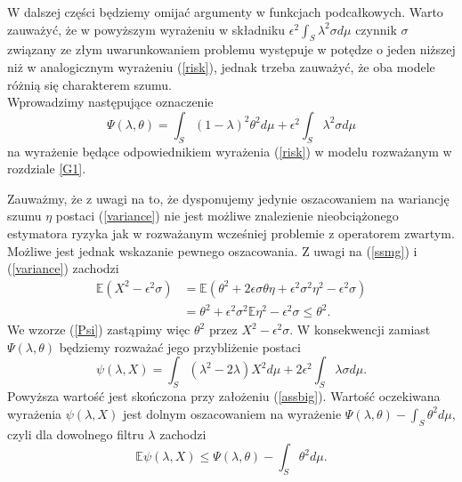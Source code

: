 \documentclass[man,mfiu]{mgrwms}
\begin{document}
W dalszej części będziemy omijać argumenty w funkcjach podcałkowych. Warto zauważyć, że w powyższym wyrażeniu w składniku $\epsilon^2\int_S\lambda^2\sigma d\mu$ czynnik $\sigma$ związany ze złym uwarunkowaniem problemu występuje w potędze o jeden niższej niż w analogicznym wyrażeniu (\ref{risk}), jednak trzeba zauważyć, że oba modele różnią się charakterem szumu.\\
\indent Wprowadzimy następujące oznaczenie 
\begin{equation}\label{Psi}
\Psi(\lambda,\theta)=\int_S(1-\lambda)^2\theta^2d\mu+\epsilon^2\int_S\lambda^2\sigma d\mu
\end{equation}
na wyrażenie będące odpowiednikiem wyrażenia (\ref{risk}) w modelu rozważanym w rozdziale \ref{G1}.

Zauważmy, że z uwagi na to, że dysponujemy jedynie oszacowaniem na wariancję szumu $\eta$ postaci (\ref{variance}) nie jest możliwe znalezienie nieobciążonego estymatora ryzyka jak w rozważanym wcześniej problemie z operatorem zwartym. Możliwe jest jednak wskazanie pewnego oszacowania. Z uwagi na (\ref{ssmg}) i (\ref{variance}) zachodzi
\begin{displaymath}
\begin{split}
\mathbb{E}\left(X^2-\epsilon^2\sigma\right)&=\mathbb{E}\left(\theta^2+2\epsilon\sigma\theta\eta+\epsilon^2\sigma^2\eta^2-\epsilon^2\sigma\right)\\
&=\theta^2+\epsilon^2\sigma^2\mathbb{E}\eta^2-\epsilon^2\sigma\leq \theta^2.
\end{split}
\end{displaymath} 
We wzorze (\ref{Psi}) zastąpimy więc $\theta^2$ przez $X^2 -\epsilon^2 \sigma$. W konsekwencji zamiast $\Psi(\lambda,\theta)$ będziemy rozważać jego przybliżenie postaci 
\begin{equation}\label{ure1}
\psi(\lambda,X)=\int_S(\lambda^2-2\lambda)X^2 d\mu+ 2\epsilon^2\int_S\lambda\sigma d\mu.
\end{equation}
Powyższa wartość jest skończona przy założeniu (\ref{assbig}). Wartość oczekiwana wyrażenia $\psi(\lambda,X)$ jest dolnym oszacowaniem na wyrażenie $\Psi(\lambda,\theta)-\int_S\theta^2d\mu $, czyli dla dowolnego filtru $\lambda$ zachodzi 
\begin{displaymath}
\mathbb{E}\psi (\lambda,X)\leq \Psi(\lambda,\theta)-\int_S\theta^2d\mu.
\end{displaymath}
\end{document}
